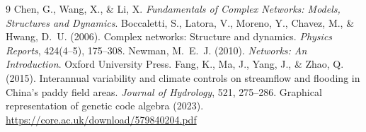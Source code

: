 \documentclass[11pt]{article}
\begin{document}
\begin{thebibliography}{9}
 Chen, G., Wang, X., \& Li, X. \textit{Fundamentals of Complex Networks: Models,
Structures and Dynamics}.
 Boccaletti, S., Latora, V., Moreno, Y., Chavez, M., \& Hwang, D.~U. (2006).
Complex networks: Structure and dynamics. \textit{Physics Reports}, 424(4--5), 175--308.
 Newman, M.~E.~J. (2010). \textit{Networks: An Introduction}. Oxford University Press.
 Fang, K., Ma, J., Yang, J., \& Zhao, Q. (2015). Interannual variability and climate
controls on streamflow and flooding in China's paddy field areas. \textit{Journal of Hydrology}, 521,
275--286.
 Graphical representation of genetic code algebra (2023).
\url{https://core.ac.uk/download/579840204.pdf}
\end{thebibliography}
\end{document}
